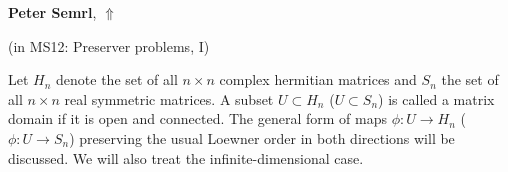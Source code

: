 \documentclass[ILAS2025-program.tex]{subfiles}
\begin{document}
\hypertarget{down0016}{}\begin{ilasabstract}
    
\textbf{Peter Semrl},  \hfill \hyperlink{up0016}{$\Uparrow$}
    
    
(in {\color{mstitle}MS12: Preserver problems, I})
        
\mtskip
    Let $H_n$ denote the set of all $n\times n$ complex hermitian matrices and $S_n$ the set of all $n \times n$ real symmetric matrices. A subset $U \subset H_n$ ($U \subset S_n$) is called a matrix domain if it is open and connected. The general form of maps $\phi : U \to H_n$ ($\phi : U \to S_n$) preserving the usual Loewner order in both directions will be discussed. We will also treat the infinite-dimensional case.

\end{ilasabstract}
    
\end{document}
